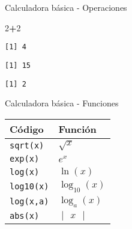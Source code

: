 \documentclass[
  ignorenonframetext,
]{beamer}
\newenvironment{Shaded}{\begin{snugshade}}{\end{snugshade}}
\newcommand{\DecValTok}[1]{\textcolor[rgb]{0.00,0.00,0.81}{#1}}
\newcommand{\OperatorTok}[1]{\textcolor[rgb]{0.81,0.36,0.00}{\textbf{#1}}}
\begin{document}
\begin{frame}[fragile]{Calculadora básica - Operaciones}
\protect\hypertarget{calculadora-buxe1sica---operaciones-2}{}

\begin{Shaded}
\begin{Highlighting}[]
\DecValTok{2}\OperatorTok{+}\DecValTok{2}
\end{Highlighting}
\end{Shaded}

\begin{verbatim}
[1] 4
\end{verbatim}

\begin{Shaded}
\end{Shaded}

\begin{verbatim}
[1] 15
\end{verbatim}

\begin{Shaded}
\end{Shaded}

\begin{verbatim}
[1] 2
\end{verbatim}

\end{frame}

\begin{frame}[fragile]{Calculadora básica - Funciones}
\protect\hypertarget{calculadora-buxe1sica---funciones}{}

\begin{longtable}[]{@{}ll@{}}
\toprule
Código & Función\tabularnewline
\midrule
\endhead
\texttt{sqrt(x)} & \(\sqrt{x}\)\tabularnewline
\texttt{exp(x)} & \(e^x\)\tabularnewline
\texttt{log(x)} & \(\ln(x)\)\tabularnewline
\texttt{log10(x)} & \(\log_{10}(x)\)\tabularnewline
\texttt{log(x,a)} & \(\log_a(x)\)\tabularnewline
\texttt{abs(x)} & \(\begin{vmatrix}x\end{vmatrix}\)\tabularnewline
\bottomrule
\end{longtable}

\end{frame}
\end{document}

